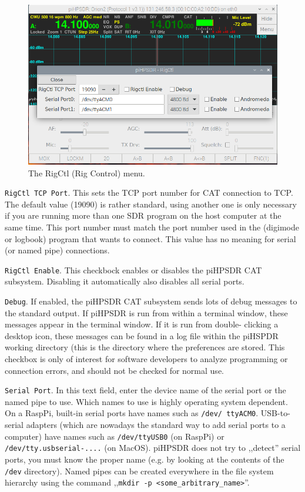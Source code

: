 \documentclass[12pt]{book}
\def\rett#1{\texttt{\color{red}#1}}
\begin{document}
\begin{figure}[ht]
\center
\includegraphics[width=12cm]{RigCtlMenu.png}
\caption{The RigCtl (Rig Control) menu.}
\label{fig:RigCtlMenu}
\end{figure}

\rett{RigCtl TCP Port}. This sets the TCP port number for CAT connection to TCP. The default value (19090)
is rather standard,
using another one is only necessary if you are running more than one SDR program on the host computer at the
same time.
This port number must match the port number used in the (digimode or logbook) program that wants to connect.
This value
has no meaning for serial (or named pipe) connections.

\rett{RigCtl Enable}. This checkbock enables or disables the piHPSDR CAT subsystem. Disabling it
automatically also disables
all serial ports.

\rett{Debug}. If enabled, the piHPSDR CAT subsystem sends lots of debug messages to the standard output. If
piHPSDR is run
from within a terminal window, these messages appear in the terminal window. If it is run from double-
clicking a desktop icon,
these messages can be found in a log file within the piHSPDR working directory (this is the directory where
the preferences
are stored. This checkbox is only of interest for software developers to analyze programming or connection
errors, and should
not be checked for normal use.

\rett{Serial Port}. In this text field, enter the device name of the serial port or the named pipe to use.
Which names to use
is highly operating system dependent. On a RaspPi, built-in serial ports have names such as \texttt{/dev/
ttyACM0}. USB-to-serial
adapters (which are nowadays the standard way to add serial ports to a computer) have names such as
\texttt{/dev/ttyUSB0} (on RaspPi) or \texttt{/dev/tty.usbserial-....} (on MacOS). piHPSDR does not try
to ,,detect'' serial
ports, you must know the proper name (e.g. by looking at the contents of the \texttt{/dev} directory).
Named pipes can be created everywhere in the file system hierarchy using the command
,,\texttt{mkdir -p <some\_arbitrary\_name>}''.
\end{document}
